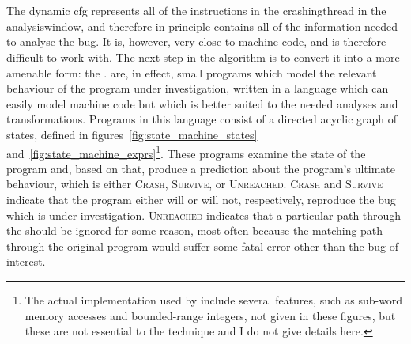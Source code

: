 \section{\STateMachines}
\label{sect:derive:state_machines}

The \gls{dynamic cfg} represents all of the instructions in the
\gls{crashingthread} in the \gls{analysiswindow}, and therefore in
principle contains all of the information needed to analyse the bug.
It is, however, very close to machine code, and is therefore difficult
to work with.  The next step in the algorithm is to convert it into a
more amenable form: the {\StateMachine}.  {\STateMachines} are, in
effect, small programs which model the relevant behaviour of the
program under investigation, written in a language which can easily
model machine code but which is better suited to the needed analyses
and transformations.  Programs in this language consist of a directed
acyclic graph of {\StateMachine} states, defined in
figures~\ref{fig:state_machine_states}
and~\ref{fig:state_machine_exprs}\footnote{The actual implementation
  used by {\implementation} include several features, such as sub-word
  memory accesses and bounded-range integers, not given in these
  figures, but these are not essential to the {\technique} technique
  and I do not give details here.}\!\!.  These {\StateMachine} programs
examine the state of the program and, based on that, produce a
prediction about the program's ultimate behaviour, which is either
\textsc{Crash}, \textsc{Survive}, or \textsc{Unreached}.
\textsc{Crash} and \textsc{Survive} indicate that the program either
will or will not, respectively, reproduce the bug which is under
investigation.  \textsc{Unreached} indicates that a particular path
through the {\StateMachine} should be ignored for some reason, most
often because the matching path through the original program would
suffer some fatal error other than the bug of interest.

